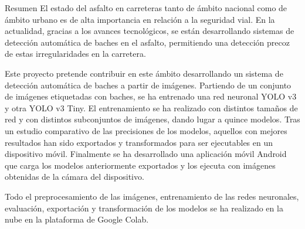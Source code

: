 \begin{poliabstract}{Resumen}
\noindent
El estado del asfalto en carreteras tanto de ámbito nacional como de ámbito urbano es de alta importancia en relación a la seguridad vial. En la actualidad, gracias a los avances tecnológicos, se están desarrollando sistemas de detección automática de baches en el asfalto, permitiendo una detección precoz de estas irregularidades en la carretera.

\doublespacing\singlespacing
\noindent
Este proyecto pretende contribuir en este ámbito desarrollando un sistema de detección automática de baches a partir de imágenes. Partiendo de un conjunto de imágenes etiquetadas con baches, se ha entrenado una red neuronal YOLO v3 y otra YOLO v3 Tiny. El entrenamiento se ha realizado con distintos tamaños de red y con distintos subconjuntos de imágenes, dando lugar a quince modelos. Tras un estudio comparativo de las precisiones de los modelos, aquellos con mejores resultados han sido exportados y transformados para ser ejecutables en un dispositivo móvil. Finalmente se ha desarrollado una aplicación móvil Android que carga los modelos anteriormente exportados y los ejecuta con imágenes obtenidas de la cámara del dispositivo.

\doublespacing\singlespacing
\noindent
Todo el preprocesamiento de las imágenes, entrenamiento de las redes neuronales, evaluación, exportación y transformación de los modelos se ha realizado en la nube en la plataforma de Google Colab.
\end{poliabstract}